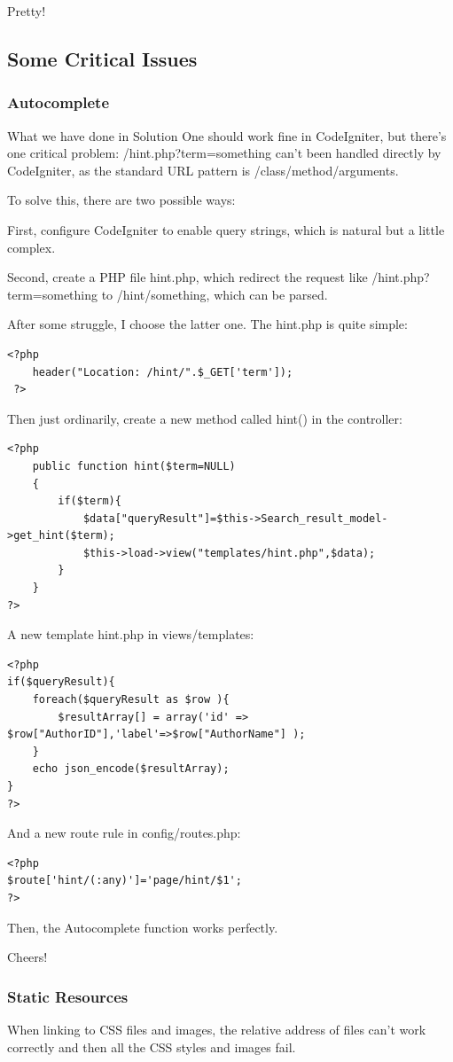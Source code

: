 \documentclass[a4paper]{article}
\begin{document}
Pretty!
        \subsection{Some Critical Issues}
            \subsubsection{Autocomplete}
What we have done in Solution One should work fine in CodeIgniter, but there's one critical problem:
/hint.php?term=something can't been handled directly by CodeIgniter, as the standard URL pattern is /class/method/arguments.

To solve this, there are two possible ways:

First, configure CodeIgniter to enable query strings, which is natural but a little complex.

Second, create a PHP file hint.php, which redirect the request like /hint.php?term=something to /hint/something, which can be parsed.

After some struggle, I choose the latter one. The hint.php is quite simple:
                \begin{verbatim}
<?php
    header("Location: /hint/".$_GET['term']);
 ?>
                \end{verbatim}
Then just ordinarily, create a new method called hint() in the controller:
                \begin{verbatim}
<?php
    public function hint($term=NULL)
    {
        if($term){
            $data["queryResult"]=$this->Search_result_model->get_hint($term);
            $this->load->view("templates/hint.php",$data);
        }
    }
?>
                \end{verbatim}
A new template hint.php in views/templates:
                \begin{verbatim}
<?php
if($queryResult){
    foreach($queryResult as $row ){
        $resultArray[] = array('id' => $row["AuthorID"],'label'=>$row["AuthorName"] );
    }
    echo json_encode($resultArray);
}
?>
                \end{verbatim}
And a new route rule in config/routes.php:
                \begin{verbatim}
<?php
$route['hint/(:any)']='page/hint/$1';
?>
                \end{verbatim}
Then, the Autocomplete function works perfectly.

Cheers!
            \subsubsection{Static Resources}
When linking to CSS files and images, the relative address of files can't work correctly and then all the CSS styles and images fail.
\end{document}
